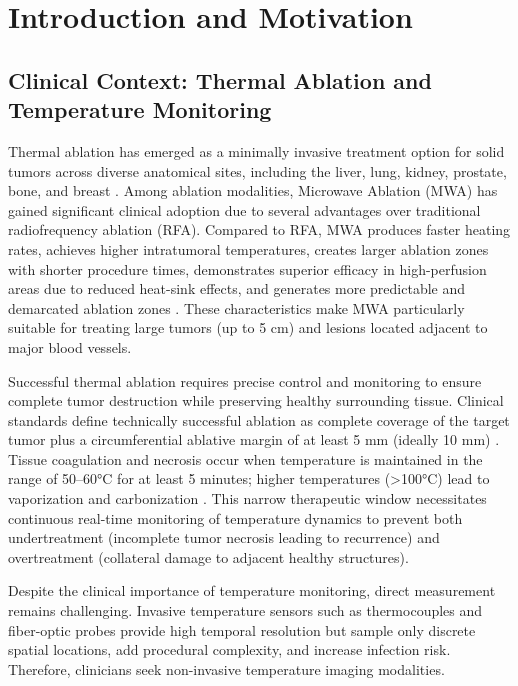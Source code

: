 \section{Introduction and Motivation}

\subsection{Clinical Context: Thermal Ablation and Temperature Monitoring}

Thermal ablation has emerged as a minimally invasive treatment option for solid tumors across diverse anatomical sites, including the liver, lung, kidney, prostate, bone, and breast \cite{vogl2017, shibata2000, ahmed2014}.
Among ablation modalities, Microwave Ablation (MWA) has gained significant clinical adoption due to several advantages over traditional radiofrequency ablation (RFA).
Compared to RFA, MWA produces faster heating rates, achieves higher intratumoral temperatures, creates larger ablation zones with shorter procedure times, demonstrates superior efficacy in high-perfusion areas due to reduced heat-sink effects, and generates more predictable and demarcated ablation zones \cite{vogl2017, lubner2010}.
These characteristics make MWA particularly suitable for treating large tumors (up to 5 cm) and lesions located adjacent to major blood vessels.

Successful thermal ablation requires precise control and monitoring to ensure complete tumor destruction while preserving healthy surrounding tissue.
Clinical standards define technically successful ablation as complete coverage of the target tumor plus a circumferential ablative margin of at least 5 mm (ideally 10 mm) \cite{ahmed2014}.
Tissue coagulation and necrosis occur when temperature is maintained in the range of 50--60°C for at least 5 minutes; higher temperatures (>100°C) lead to vaporization and carbonization \cite{vogl2017}.
This narrow therapeutic window necessitates continuous real-time monitoring of temperature dynamics to prevent both undertreatment (incomplete tumor necrosis leading to recurrence) and overtreatment (collateral damage to adjacent healthy structures).

Despite the clinical importance of temperature monitoring, direct measurement remains challenging.
Invasive temperature sensors such as thermocouples and fiber-optic probes provide high temporal resolution but sample only discrete spatial locations, add procedural complexity, and increase infection risk.
Therefore, clinicians seek non-invasive temperature imaging modalities.

